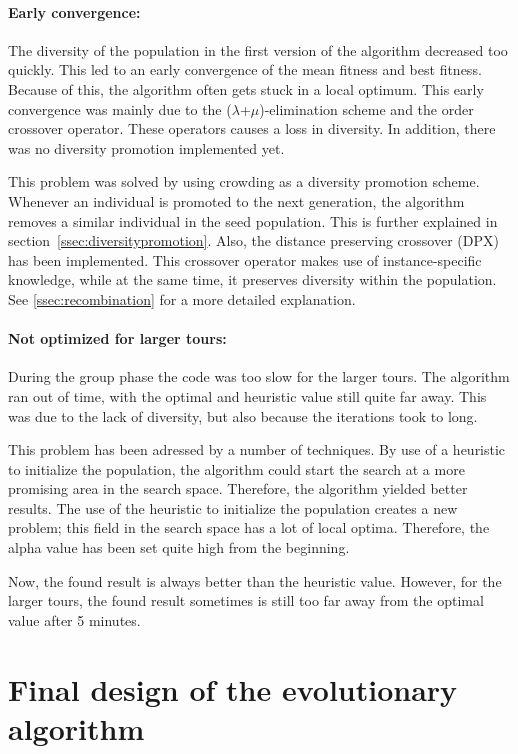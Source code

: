 \documentclass[a4paper,10pt]{article}
\begin{document}
\paragraph{Early convergence:} The diversity of the population in the first version of the algorithm decreased too quickly. This led to an early convergence of the mean fitness and best fitness. Because of this, the algorithm often gets stuck in a local optimum. This early convergence was mainly due to the ($\lambda$+$\mu$)-elimination scheme and the order crossover operator. These operators causes a loss in diversity. In addition, there was no diversity promotion implemented yet.

This problem was solved by using crowding as a diversity promotion scheme. Whenever an individual is promoted to the next generation, the algorithm removes a similar individual in the seed population. This is further explained in section~\ref{ssec:diversitypromotion}. Also, the distance preserving crossover (DPX) has been implemented. This crossover operator makes use of instance-specific knowledge, while at the same time, it preserves diversity within the population. See \ref{ssec:recombination} for a more detailed explanation. 

\paragraph{Not optimized for larger tours:} During the group phase the code was too slow for the larger tours. The algorithm ran out of time, with the optimal and heuristic value still quite far away. This was due to the lack of diversity, but also because the iterations took to long. 

This problem has been adressed by a number of techniques. By use of a heuristic to initialize the population, the algorithm could start the search at a more promising area in the search space. Therefore, the algorithm yielded better results. The use of the heuristic to initialize the population creates a new problem; this field in the search space has a lot of local optima. Therefore, the alpha value has been set quite high from the beginning. 

Now, the found result is always better than the heuristic value. However, for the larger tours, the found result sometimes is still too far away from the optimal value after 5 minutes. 


\section{Final design of the evolutionary algorithm}\label{sec:design} 
\end{document}
